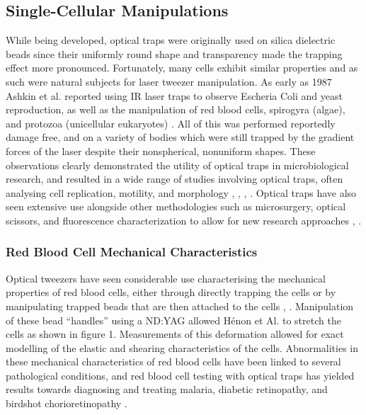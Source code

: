 \documentclass{article}
\begin{document}
\subsection*{Single-Cellular Manipulations}

While being developed, optical traps were originally used on silica dielectric beads since their uniformly round shape and transparency made the trapping effect more pronounced. Fortunately, many cells exhibit similar properties and as such were natural subjects for laser tweezer manipulation. As early as 1987 Ashkin et al. reported using IR laser traps to observe Escheria Coli and yeast reproduction, as well as the manipulation of red blood cells, spirogyra (algae), and protozoa (unicellular eukaryotes) \cite{Ashkin1987}. All of this was performed reportedly damage free, and on a variety of bodies which were still trapped by the gradient forces of the laser despite their nonspherical, nonuniform shapes. These observations clearly demonstrated the utility of optical traps in microbiological research, and resulted in a wide range of studies involving optical traps, often analysing cell replication, motility, and morphology \cite{Lang2003-ll}, \cite{Mammen1996-qn}, \cite{Svoboda1992-xm}, \cite{DAI1995988}. Optical traps have also seen extensive use alongside other methodologies such as microsurgery, optical scissors, and fluorescence characterization to allow for new research approaches \cite{Lang2003-ll}, \cite{LIANG1993110}.



\subsubsection*{Red Blood Cell Mechanical Characteristics}

Optical tweezers have seen considerable use characterising the mechanical properties of red blood cells, either through directly trapping the cells or by manipulating trapped beads that are then attached to the cells \cite{2018_Polimeno}, \cite{Henon1999-nc}. Manipulation of these bead “handles” using a ND:YAG allowed Hénon et Al. to stretch the cells as shown in figure 1. Measurements of this deformation allowed for exact modelling of the elastic and shearing characteristics of the cells. Abnormalities in these mechanical characteristics of red blood cells have been linked to several pathological conditions, and red blood cell testing with optical traps has yielded results towards diagnosing and treating malaria, diabetic retinopathy, and birdshot chorioretinopathy \cite{2018_Polimeno}.
\end{document}
